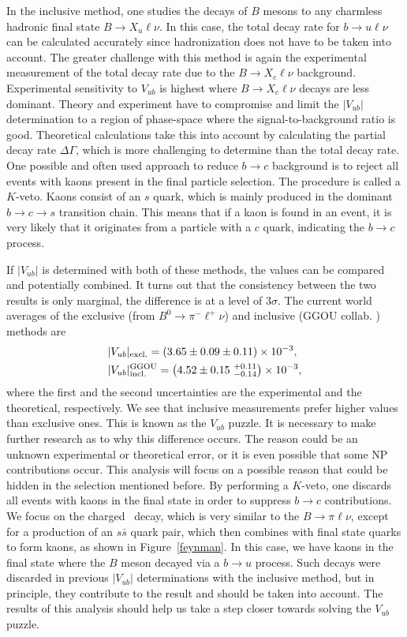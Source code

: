 In the inclusive method, one studies the decays of $B$ mesons to any charmless hadronic final state $B \to X_u \ell \nu$. In this case, the total decay rate for $b \to u \ell \nu$ can be calculated accurately since hadronization does not have to be taken into account. The greater challenge with this method is again the experimental measurement of the total decay rate due to the $B \to X_c \ell \nu$ background. Experimental sensitivity to $V_{ub}$ is highest where $B \to X_c \ell \nu$ decays are less dominant. Theory and experiment have to compromise and limit the $\vert V_{ub}\vert $ determination to a region of phase-space where the signal-to-background ratio is good. Theoretical calculations take this into account by calculating the partial decay rate $\Delta \Gamma$, which is more challenging to determine than the total decay rate. One possible and often used approach to reduce $b \to c$ background is to reject all events with kaons present in the final particle selection. The procedure is called a $K$-veto. Kaons consist of an $s$ quark, which is mainly produced in the dominant $b \to c \to s$ transition chain. This means that if a kaon is found in an event, it is very likely that it originates from a particle with a $c$ quark, indicating the $b \to c$ process. 

If $\vert V_{ub} \vert$ is determined with both of these methods, the values can be compared and potentially combined. It turns out that the consistency between the two results is only marginal, the difference is at a level of $3\sigma$. The current world averages \cite{Amhis:2016xyh} of the exclusive (from $B^0 \to \pi^- \ell^+ \nu$) and inclusive (GGOU collab. \cite{Gambino:2007rp}) methods are
\begin{align}
&\vert V_{ub} \vert_{\mathrm{excl.}} = \left(3.65 \pm 0.09 \pm 0.11\right)\times 10^{-3},\\
&\vert V_{ub} \vert_{\mathrm{incl.}}^{\mathrm{GGOU}} = \left(4.52 \pm 0.15~{}^{+0.11}_{-0.14}\right)\times 10^{-3},
\end{align}
where the first and the second uncertainties are the experimental and the theoretical, respectively. We see that inclusive measurements prefer higher values than exclusive ones. This is known as the $V_{ub}$ puzzle. It is necessary to make further research as to why this difference occurs. The reason could be an unknown experimental or theoretical error, or it is even possible that some NP contributions occur. This analysis will focus on a possible reason that could be hidden in the selection mentioned before. By performing a $K$-veto, one discards all events with kaons in the final state in order to suppress $b \to c$ contributions. We focus on the charged \decaya~decay, which is very similar to the $B \to \pi \ell \nu$, except for a production of an $s \bar s$ quark pair, which then combines with final state quarks to form kaons, as shown in Figure~\ref{feynman}. In this case, we have kaons in the final state where the $B$ meson decayed via a $b \to u$ process. Such decays were discarded in previous $\vert V_{ub} \vert$ determinations with the inclusive method, but in principle, they contribute to the result and should be taken into account. The results of this analysis should help us take a step closer towards solving the $V_{ub}$ puzzle. 

